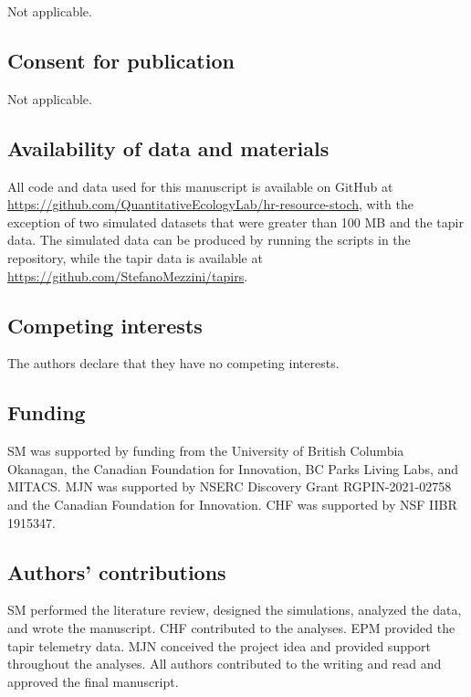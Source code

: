 \documentclass[
  12pt,
]{article}
\begin{document}
\noindent Not applicable.

\subsection{Consent for publication}\label{consent-for-publication}

\noindent Not applicable.

\subsection{Availability of data and materials}\label{availability-of-data-and-materials}

\noindent All code and data used for this manuscript is available on GitHub at \url{https://github.com/QuantitativeEcologyLab/hr-resource-stoch}, with the exception of two simulated datasets that were greater than 100 MB and the tapir data. The simulated data can be produced by running the scripts in the repository, while the tapir data is available at \url{https://github.com/StefanoMezzini/tapirs}.

\subsection{Competing interests}\label{competing-interests}

\noindent The authors declare that they have no competing interests.

\subsection{Funding}\label{funding}

\noindent SM was supported by funding from the University of British Columbia Okanagan, the Canadian Foundation for Innovation, BC Parks Living Labs, and MITACS. MJN was supported by NSERC Discovery Grant RGPIN-2021-02758 and the Canadian Foundation for Innovation. CHF was supported by NSF IIBR 1915347.

\subsection{Authors' contributions}\label{authors-contributions}

\noindent SM performed the literature review, designed the simulations, analyzed the data, and wrote the manuscript. CHF contributed to the analyses. EPM provided the tapir telemetry data. MJN conceived the project idea and provided support throughout the analyses. All authors contributed to the writing and read and approved the final manuscript.
\end{document}
